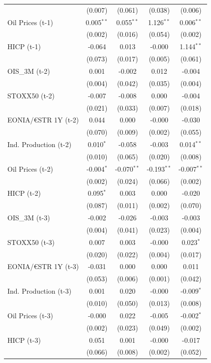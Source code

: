\begin{longtable}[t]{lcccc}
 & (0.007) & (0.061) & (0.038) & (0.006)\\
Oil Prices (t-1) & 0.005$^{**}$ & 0.055$^{**}$ & 1.126$^{**}$ & 0.006$^{**}$\\
 & (0.002) & (0.016) & (0.054) & (0.002)\\
HICP (t-1) & -0.064 & 0.013 & -0.000 & 1.144$^{**}$\\
 & (0.073) & (0.017) & (0.005) & (0.061)\\
OIS\_3M (t-2) & 0.001 & -0.002 & 0.012 & -0.004\\
 & (0.004) & (0.042) & (0.035) & (0.004)\\
STOXX50 (t-2) & -0.007 & -0.008 & 0.000 & -0.004\\
 & (0.021) & (0.033) & (0.007) & (0.018)\\
EONIA/€STR 1Y (t-2) & 0.044 & 0.000 & -0.000 & -0.030\\
 & (0.070) & (0.009) & (0.002) & (0.055)\\
Ind. Production (t-2) & 0.010$^{*}$ & -0.058 & -0.003 & 0.014$^{**}$\\
 & (0.010) & (0.065) & (0.020) & (0.008)\\
Oil Prices (t-2) & -0.004$^{*}$ & -0.070$^{**}$ & -0.193$^{**}$ & -0.007$^{**}$\\
 & (0.002) & (0.024) & (0.066) & (0.002)\\
HICP (t-2) & 0.095$^{*}$ & 0.003 & 0.000 & -0.020\\
 & (0.087) & (0.011) & (0.002) & (0.070)\\
OIS\_3M (t-3) & -0.002 & -0.026 & -0.003 & -0.003\\
 & (0.004) & (0.041) & (0.023) & (0.004)\\
STOXX50 (t-3) & 0.007 & 0.003 & -0.000 & 0.023$^{*}$\\
 & (0.020) & (0.022) & (0.004) & (0.017)\\
EONIA/€STR 1Y (t-3) & -0.031 & 0.000 & 0.000 & 0.011\\
 & (0.053) & (0.006) & (0.001) & (0.042)\\
Ind. Production (t-3) & 0.001 & 0.020 & -0.000 & -0.009$^{*}$\\
 & (0.010) & (0.050) & (0.013) & (0.008)\\
Oil Prices (t-3) & -0.000 & 0.022 & -0.005 & -0.002$^{*}$\\
 & (0.002) & (0.023) & (0.049) & (0.002)\\
HICP (t-3) & 0.051 & 0.001 & -0.000 & -0.017\\
 & (0.066) & (0.008) & (0.002) & (0.052)\\

\end{longtable}
